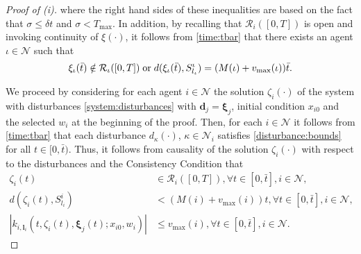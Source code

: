 \documentclass[reqno]{amsart}
\theoremstyle{plain}
\theoremstyle{definition}
\numberwithin{equation}{section}
\begin{document}
\begin{proof}[Proof of (i)]
\noindent where the right hand sides of these inequalities are based on the fact that $\sigma\le\delta t$ and $\sigma<T_{\max}$. In addition, by recalling that ${\ensuremath{\mathcal{R}}}_i([0,T])$ is open and invoking continuity of $\xi(\cdot)$, it follows from \eqref{time:tbar} that there exists an agent $\iota\in{\ensuremath{\mathcal{N}}}$  such that 
\begin{equation} \label{iota:contradiction}
\xi_{\iota}(\bar{t})\notin{\ensuremath{\mathcal{R}}}_{\iota}([0,T])\;{\rm or}\; d(\xi_{\iota}(\bar{t}),S_{l_{\iota}}^{\iota}) = (M(\iota)+v_{\max}(\iota))\bar{t}.
\end{equation}

\noindent We proceed by considering for each agent $i\in{\ensuremath{\mathcal{N}}}$ the solution $\zeta_i(\cdot)$ of the system with disturbances \eqref{system:disturbances} with ${\textbf{{d}}}_j={\ensuremath{\boldsymbol{{\xi}}}}_j$, initial condition $x_{i0}$ and the selected $w_i$ at the beginning of the proof. Then, for each $i\in{\ensuremath{\mathcal{N}}}$ it follows from \eqref{time:tbar} that each disturbance $d_{\kappa}(\cdot)$, $\kappa\in{\ensuremath{\mathcal{N}}}_i$ satisfies \eqref{disturbance:bounds} for all $t\in[0,\bar{t})$. Thus, it follows from causality of the solution $\zeta_i(\cdot)$ with respect to the disturbances and the Consistency Condition that
\begin{align}
\zeta_i(t) & \in{\ensuremath{\mathcal{R}}}_i([0,T]), \forall t\in[0,\bar{t}],i\in{\ensuremath{\mathcal{N}}}, \label{zetai:property1} \\
d(\zeta_i(t),S_{l_i}^i) & < (M(i)+v_{\max}(i))t, \forall t\in[0,\bar{t}],i\in{\ensuremath{\mathcal{N}}}, \label{zetai:property2} \\
|k_{i,{\textbf{{l}}}_i}(t,\zeta_{i}(t),{\ensuremath{\boldsymbol{{\xi}}}}_j(t);x_{i0},w_i)| & \le v_{\max}(i), \forall t\in[0,\bar t], i\in{\ensuremath{\mathcal{N}}}. \label{zetai:property3}
\end{align}


\end{proof}
\end{document}
